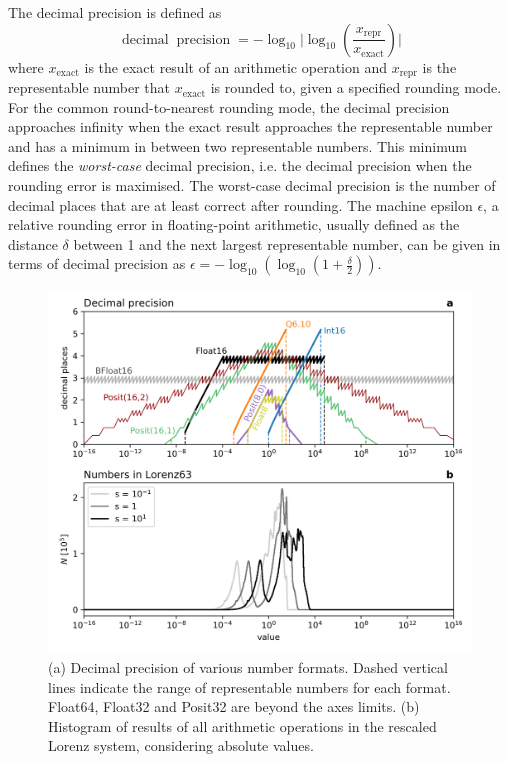 \documentclass[draft]{agujournal2019}
\newcommand{\op}{\operatorname}
\begin{document}
The decimal precision is defined as \cite{Gustafson2017,Gustafson2017a}
\begin{equation}
\op{decimal} \op{precision} = -\log_{10} \vert \log_{10}( \frac{x_\text{repr}}{x_\text{exact}} ) \vert
\end{equation}
where $x_\text{exact}$ is the exact result of an arithmetic operation and $x_\text{repr}$ is the representable number that $x_\text{exact}$ is rounded to, given a specified rounding mode. For the common round-to-nearest rounding mode, the decimal precision approaches infinity when the exact result approaches the representable number and has a minimum in between two representable numbers. This minimum defines the \emph{worst-case} decimal precision, i.e. the decimal precision when the rounding error is maximised. The worst-case decimal precision is the number of decimal places that are at least correct after rounding. The machine epsilon $\epsilon$, a relative rounding error in floating-point arithmetic, usually defined as the distance $\delta$ between 1 and the next largest representable number, can be given in terms of decimal precision as $\epsilon = -\log_{10} ( \log_{10}( 1 + \frac{\delta}{2} ))$.


\begin{figure}[htbp]
\includegraphics[width=1\textwidth]{decimal_precision.png}
\caption{(a) Decimal precision of various number formats. Dashed vertical lines indicate the range of representable numbers for each format. Float64, Float32 and Posit32 are beyond the axes limits. (b) Histogram of results of all arithmetic operations in the rescaled Lorenz system, considering absolute values.}
\label{fig:dec_prec}
\end{figure}
\end{document}
